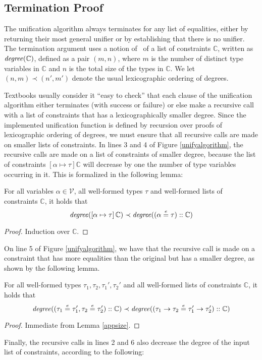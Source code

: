\subsection{Termination Proof}\label{termination}

\newcommand{\degree}{\text{\it degree\/}} The unification algorithm
always terminates for any list of equalities, either by returning
their most general unifier or by establishing that there is no
unifier. The termination argument uses a notion of \degree\ of a list
of constraints $\mathbb{C}$, written as $\degree(\mathbb{C})$, defined
as a pair $(m,n)$, where $m$ is the number of distinct type variables
in $\mathbb{C}$ and $n$ is the total size of the types in
$\mathbb{C}$. We let $(n,m)\prec (n',m')$ denote the usual
lexicographic ordering of degrees.

Textbooks usually consider it ``easy to check'' that each clause of
the unification algorithm either terminates (with success or failure)
or else make a recursive call with a list of constraints that has a
lexicographically smaller degree. Since the implemented unification
function is defined by recursion over proofs of lexicographic ordering
of degrees, we must ensure that all recursive calls are made on
smaller lists of constraints.  In lines 3 and 4 of Figure \ref{unifyalgorithm}, the recursive calls
are made on a list of constraints of smaller degree, because the list
of constraints $[\alpha\mapsto\tau]\mathbb{C}$ will decrease by one
the number of type variables occurring in it. This is formalized in
the following lemma:

\begin{Lemma}\label{lem-termination-1}
For all variables $\alpha \in \mathcal{V}$, all well-formed types
$\tau$ and well-formed lists of constraints $\mathbb{C}$, it holds
that 
  \[ \degree([\alpha\mapsto \tau]\,\mathbb{C})\prec 
     \degree((\alpha \eeq \tau) :: \mathbb{C})\]
\end{Lemma}
\begin{proof}
Induction over $\mathbb{C}$. 
\end{proof}

On line 5 of Figure \ref{unifyalgorithm}, we have that the recursive
call is made on a constraint that has more equalities than the
original but has a smaller degree, as shown by the following lemma.

\begin{Lemma}\label{lem-termination-2}
For all well-formed types $\tau_1, \tau_2, \tau_1', \tau_2'$ and all well-formed lists of constraints $\mathbb{C}$, it holds that
\[\degree((\tau_1\eeq\tau_1',\tau_2\eeq\tau_2') :: \mathbb{C})
\prec
\degree((\tau_1\to\tau_2\eeq\tau_1'\to\tau_2') :: \mathbb{C})\]
\end{Lemma}
\begin{proof}
Immediate from Lemma \ref{appsize}.
\end{proof}
Finally, the recursive calls in lines 2 and 6 also decrease the degree
of the input list of constraints, according to the following:

